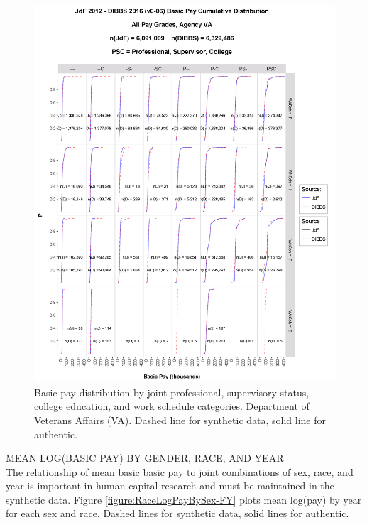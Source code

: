 \documentclass[10pt, letterpaper]{article}
\begin{document}
\begin{spacing}{1.0}
\begin{figure}[h]
    \centering
    \includegraphics[width=6.5in, trim={0 0 1in 1.5in}, clip]{JdFDIBBSBasicPayCDFVA.png}
    \caption{Basic pay distribution by joint professional, supervisory status, college education, and work schedule  categories.  Department of Veterans Affairs (VA).  Dashed line for synthetic data, solid line for authentic.}
    \label{figure:JdFDIBBSBasicPayCDFVA}
\end{figure}

\clearpage

MEAN LOG(BASIC PAY) BY GENDER, RACE, AND YEAR\\

The relationship of mean basic basic pay to joint combinations of sex, race, and year is important in human capital research and must be maintained in the synthetic data.  Figure \ref{figure:RaceLogPayBySex-FY} plots mean log(pay) by year for each sex and race.  Dashed lines for synthetic data, solid lines for authentic.\\


\end{spacing}
\end{document}

